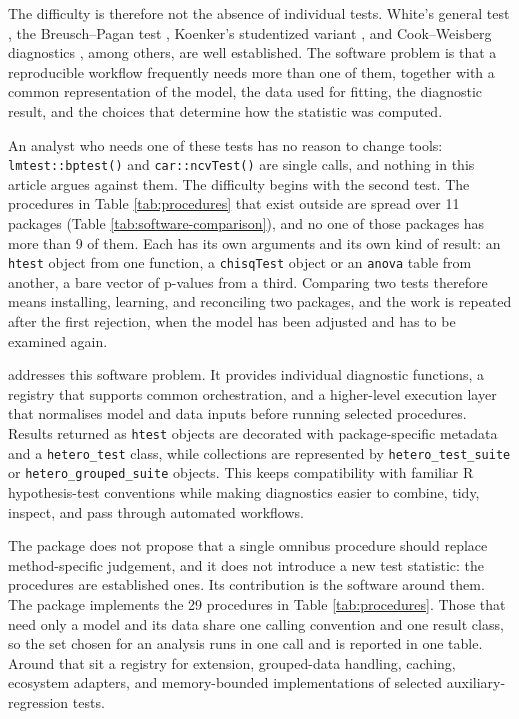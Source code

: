 The difficulty is therefore not the absence of individual tests. White's
general test \citep{white1980heteroskedasticity}, the Breusch--Pagan test
\citep{breusch1979simple}, Koenker's studentized variant \citep{koenker1981study}, and
Cook--Weisberg diagnostics \citep{cook1983detection}, among others, are well
established. The software problem is that a reproducible workflow frequently
needs more than one of them, together with a common representation of the model,
the data used for fitting, the diagnostic result, and the choices that determine
how the statistic was computed.

An analyst who needs one of these tests has no reason to change tools:
\texttt{lmtest::bptest()} and \texttt{car::ncvTest()} are single calls, and nothing in this
article argues against them. The difficulty begins with the second test. The
procedures in Table \ref{tab:procedures} that exist outside
 are spread over 11 packages (Table
\ref{tab:software-comparison}), and no one of those packages has more than
9 of them. Each has its own arguments and its own kind of
result: an \texttt{htest} object from one function, a \texttt{chisqTest} object or an
\texttt{anova} table from another, a bare vector of p-values from a third. Comparing
two tests therefore means installing, learning, and reconciling two packages,
and the work is repeated after the first rejection, when the model has been
adjusted and has to be examined again.

 addresses this software problem. It provides individual
diagnostic functions, a registry that supports common orchestration, and a
higher-level execution layer that normalises model and data inputs before
running selected procedures. Results returned as \texttt{htest} objects are decorated
with package-specific metadata and a \texttt{hetero\_test} class, while collections are
represented by \texttt{hetero\_test\_suite} or \texttt{hetero\_grouped\_suite} objects. This
keeps compatibility with familiar R hypothesis-test conventions while making
diagnostics easier to combine, tidy, inspect, and pass through automated
workflows.

The package does not propose that a single omnibus procedure should replace
method-specific judgement, and it does not introduce a new test statistic: the
procedures are established ones. Its contribution is the software around them.
The package implements the 29 procedures in Table
\ref{tab:procedures}. Those that need only a model and its data share one
calling convention and one result class, so the set chosen for an analysis
runs in one call and is reported in one table. Around that sit a registry for
extension, grouped-data handling, caching, ecosystem adapters, and
memory-bounded implementations of selected auxiliary-regression tests.

